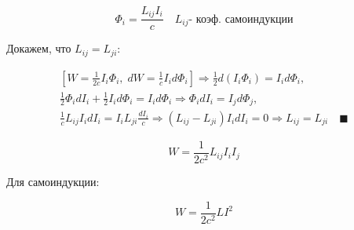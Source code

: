 \[
\Phi_i= \frac{L_{ij}I_i}{c} \quad L_{ij}\text{- коэф. самоиндукции} 
\]

Докажем, что \(  L_{ij}=L_{ji} \):

\begin{gather*}
    \left[ W = \frac{1}{2c}I_i\Phi_i, \; dW = \frac{1}{c}I_i d\Phi_i \right] 
    \Rightarrow \frac{1}{2}d(I_i\Phi_i) = I_i d\Phi_i, \\
    \frac{1}{2}\Phi_i dI_i + \frac{1}{2}I_i d\Phi_i = I_i d\Phi_i 
    \Rightarrow \Phi_i dI_i = I_j d\Phi_j, \\
    \frac{1}{c}L_{ij}I_idI_i=I_iL_{ji}\frac{dI_i}{c} \Rightarrow (L_{ij}-L_{ji})I_idI_i=0 \Rightarrow L_{ij}=L_{ji} \quad \blacksquare 
\end{gather*}

\[
W=\frac{1}{2c^2}L_{ij}I_iI_j 
\]

Для самоиндукции:

\[
W=\frac{1}{2c^2}LI^2 
\]